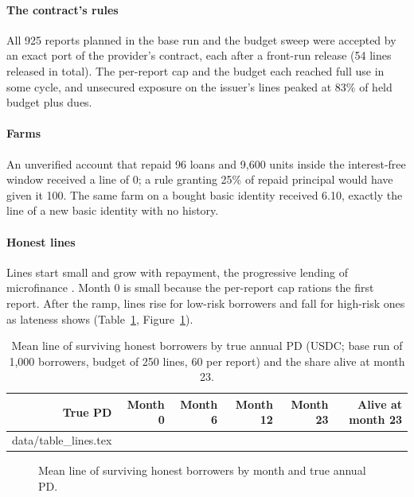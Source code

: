\documentclass[preprint,11pt,authoryear]{elsarticle}
\makeatletter
\newcommand{\inputrows}[1]{\@@input #1 }
\makeatother
\begin{document}
\paragraph{The contract's rules} All 925 reports planned in the base run and the budget sweep were
accepted by an exact port of the provider's contract, each after a front-run release (54 lines
released in total). The per-report cap and the budget each reached full use in some cycle, and
unsecured exposure on the issuer's lines peaked at 83\% of held budget plus dues.

\paragraph{Farms} An unverified account that repaid 96 loans and 9,600 units inside the
interest-free window received a line of 0; a rule granting 25\% of repaid principal would have given
it 100. The same farm on a bought basic identity received 6.10, exactly the line of a new basic
identity with no history.

\paragraph{Honest lines} Lines start small and grow with repayment, the progressive lending of
microfinance \citep{morduch1999promise,armendariz2010}. Month 0 is small because the per-report cap
rations the first report. After the ramp, lines rise for low-risk borrowers and fall for high-risk
ones as lateness shows (Table~\ref{tab:lines}, Figure~\ref{fig:lines}).

\begin{table}[ht]
  \centering\small
  \caption{Mean line of surviving honest borrowers by true annual PD (USDC; base run of 1,000
  borrowers, budget of 250 lines, 60 per report) and the share alive at month 23.}
  \label{tab:lines}
  \begin{tabular}{rrrrrr}
    \toprule
    True PD & Month 0 & Month 6 & Month 12 & Month 23 & Alive at month 23 \\
    \midrule
    \inputrows{data/table_lines.tex}
    \bottomrule
  \end{tabular}
\end{table}

\begin{figure}[ht]
  \centering
  
  \caption{Mean line of surviving honest borrowers by month and true annual PD.}
  \label{fig:lines}
\end{figure}
\end{document}
